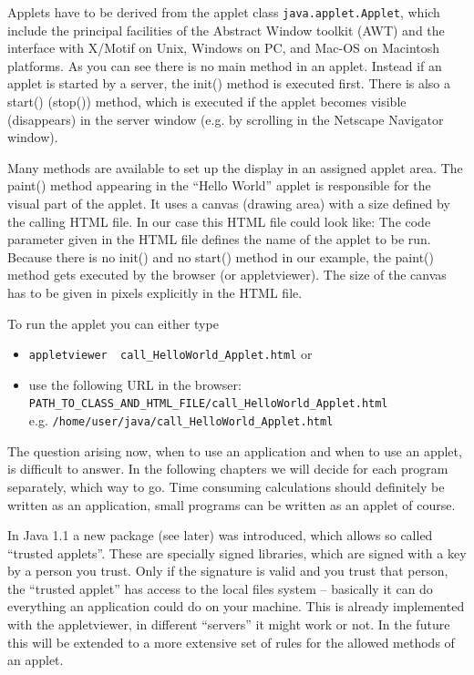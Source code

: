 Applets have to be derived from the applet class
\verb|java.applet.Applet|, which include the principal facilities of
the Abstract Window toolkit (AWT) and the interface with X/Motif on
Unix, Windows on PC, and Mac-OS on Macintosh platforms.
As you can see there is no main method in an applet. Instead if an applet
is started by a server, the init() method is executed first. There is also
a start() (stop()) method, which is executed if the applet becomes
visible (disappears) in the server window (e.g. by scrolling in the
Netscape Navigator window).

Many methods are available to set up the display in an assigned applet area.
The paint() method appearing in the ``Hello World'' applet is
responsible for the visual part of the applet. It uses a canvas
(drawing area) with a size defined by the calling HTML file. In our case
this HTML file could look like:
The code parameter given in the HTML file defines the name of the applet
to be run. Because there is no init() and no start() method in our
example, the paint() method gets executed by the browser (or appletviewer).
The size of the canvas has to be given in pixels explicitly in the
HTML file.

To run the applet you can either type
\begin{itemize}
\item \verb|appletviewer  call_HelloWorld_Applet.html| or
\item use the following URL in the browser: \\
        \verb|PATH_TO_CLASS_AND_HTML_FILE/call_HelloWorld_Applet.html| \\
        e.g. \verb|/home/user/java/call_HelloWorld_Applet.html|
\end{itemize}

The question arising now, when to use an application and when to use
an applet, is difficult to answer. In the following chapters we will 
decide for each program
separately, which way to go. Time consuming calculations should
definitely be written as an application, small programs can be
written as an applet of course.

In Java 1.1 a new package (see later) was introduced, which allows
so called ``trusted applets''. These are specially signed libraries,
which are signed with a key by a person you trust. Only if the
signature is valid and you trust that person, the ``trusted applet''
has access to the local files system -- basically it can do everything
an application could do on your machine. This is already implemented with
the appletviewer, in different ``servers'' it might work or not. In the
future this will be extended to a more extensive set of rules for the
allowed methods of an applet.

